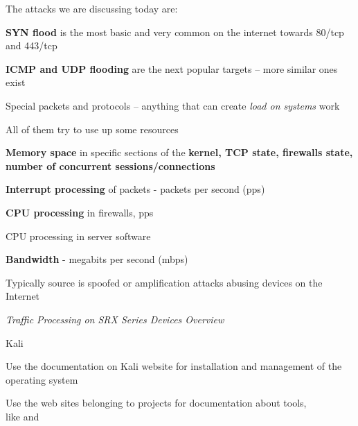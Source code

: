 \documentclass[Screen16to9,17pt]{foils}
\begin{document}
The attacks we are discussing today are:
\begin{list2}
\item {\bf SYN flood} is the most basic and very common on the internet towards 80/tcp and 443/tcp
\item {\bf ICMP and UDP flooding} are the next popular targets -- more similar ones exist
\item Special packets and protocols -- anything that can create \emph{load on systems} work
\item All of them try to use up some resources
\begin{list2}
\item {\bf Memory space} in specific sections of the {\bf kernel, TCP state, firewalls state, number of concurrent sessions/connections}
\item {\bf Interrupt processing} of packets - packets per second (pps)
\item {\bf CPU processing} in firewalls, pps
\item CPU processing in server software
\item {\bf Bandwidth} - megabits per second (mbps)
\item Typically source is spoofed or amplification attacks abusing devices on the Internet
\end{list2}
\end{list2}






\emph{Traffic Processing on SRX Series Devices Overview}\\ {\scriptsize
{}}




\begin{list1}
\item Kali 
\item Use the documentation on Kali website for installation and management of the operating system
\item Use the web sites belonging to projects for documentation about tools, \\
like  and 
\end{list1}
\end{document}
